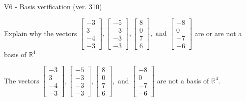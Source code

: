 \begin{exercise}
  \begin{exerciseTitle}V6 - Basis verification (ver. 310)\end{exerciseTitle}
  \begin{exerciseStatement}
    Explain why the vectors \(\left[\begin{array}{r}
-3 \\
3 \\
-4 \\
-3
\end{array}\right] , \left[\begin{array}{r}
-5 \\
-3 \\
-3 \\
-3
\end{array}\right] , \left[\begin{array}{r}
8 \\
0 \\
7 \\
6
\end{array}\right] , \text{ and } \left[\begin{array}{r}
-8 \\
0 \\
-7 \\
-6
\end{array}\right]\) are or are not a basis of \(\mathbb{R}^4\)	


  \end{exerciseStatement}
  \begin{exerciseAnswer}
   The vectors \(\left[\begin{array}{r}
-3 \\
3 \\
-4 \\
-3
\end{array}\right] , \left[\begin{array}{r}
-5 \\
-3 \\
-3 \\
-3
\end{array}\right] , \left[\begin{array}{r}
8 \\
0 \\
7 \\
6
\end{array}\right] , \text{ and } \left[\begin{array}{r}
-8 \\
0 \\
-7 \\
-6
\end{array}\right]\) 
  	 are not  a basis of \(\mathbb{R}^4\).
  


  \end{exerciseAnswer}
\end{exercise}